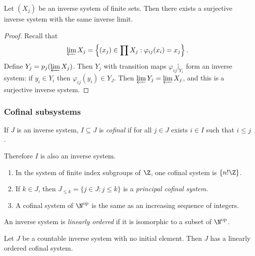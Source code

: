\documentclass[a4paper]{article}
\begin{document}
\begin{proposition}
  Let \((X_j)\) be an inverse system of finite sets. Then there exists a surjective inverse system with the same inverse limit.
\end{proposition}

\begin{proof}
  Recall that
  \[
    \varprojlim X_j = \left\{ (x_j) \in \prod X_j: \varphi_{ij}(x_i) = x_j \right\}.
  \]
  Define \(Y_j = p_j(\varprojlim X_j)\). Then \(Y_j\) with transition maps \(\varphi_{ij}|_{Y_i}\) form an inverse system: if \(y_i \in Y_i\) then \(\varphi_{ij}(y_i) \in Y_J\). Then \(\varprojlim Y_j = \varprojlim X_j\), and this is a surjective inverse system.
\end{proof}

\subsubsection{Cofinal subsystems}

\begin{definition}[cofinal]
  If \(J\) is an inverse system, \(I \subseteq J\) is \emph{cofinal} if for all \(j \in J\) exists \(i \in I\) such that \(i \leq j\).
\end{definition}
Therefore \(I\) is also an inverse system.

\begin{eg}\leavevmode
  \begin{enumerate}
  \item In the system of finite index subgroups of \(\Z\), one cofinal system is \(\{n! \Z\}\).
  \item If \(k \in J\), then \(J_{\leq k} = \{j \in J: j \leq k\}\) is a \emph{principal cofinal system}.
  \item A cofinal system of \(\N^{\text{op}}\) is the same as an increasing sequence of integers.
  \end{enumerate}
\end{eg}

\begin{definition}
  An inverse system is \emph{linearly ordered} if it is isomorphic to a subset of \(\N^{\text{op}}\).
\end{definition}

\begin{proposition}
  Let \(J\) be a countable inverse system with no initial element. Then \(J\) has a linearly ordered cofinal system.
\end{proposition}
\end{document}
